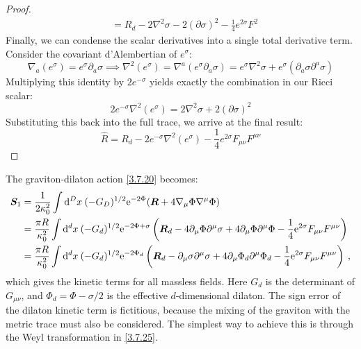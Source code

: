 \begin{tcolorbox}[breakable]
\begin{proof}
\begin{align}
				&= R_d - 2 \nabla^2 \sigma - 2 (\partial \sigma)^2 - \frac{1}{4} e^{2\sigma} F^2
			\end{align}
			Finally, we can condense the scalar derivatives into a single total derivative term. Consider the covariant d'Alembertian of $e^\sigma$:
			\begin{equation}
				\nabla_a (e^\sigma) = e^\sigma \partial_a \sigma \implies \nabla^2 (e^\sigma) = \nabla^a (e^\sigma \partial_a \sigma) = e^\sigma \nabla^2 \sigma + e^\sigma (\partial_a \sigma \partial^a \sigma)
			\end{equation}
			Multiplying this identity by $2e^{-\sigma}$ yields exactly the combination in our Ricci scalar:
			\begin{equation}
				2e^{-\sigma} \nabla^2 (e^\sigma) = 2 \nabla^2 \sigma + 2 (\partial \sigma)^2
			\end{equation}
			Substituting this back into the full trace, we arrive at the final result:
			\begin{equation}
				\boxed{ \hat{R} = R_d - 2 e^{-\sigma} \nabla^2 (e^\sigma) - \frac{1}{4} e^{2\sigma} F_{\mu\nu} F^{\mu\nu} }
			\end{equation}
	\end{proof}
\end{tcolorbox}
The graviton-dilaton action \eqref{3.7.20} becomes:
\begin{align}
	\bm{S}_{1} &= \frac{1}{2 \kappa_{0}^{2}} \int \mathrm{d}^{D} x \: (-G_{D})^{1/2} \mathrm{e}^{-2 \Phi}(\bm{R}
	+4 \nabla_{\mu} \Phi \nabla^{\mu} \Phi) \nonumber \\
	&= \frac{\pi R}{\kappa_{0}^{2}} \int \mathrm{d}^{d} x\: (-G_{d})^{1/2} \mathrm{e}^{-2 \Phi+\sigma}\left(\bm{R}_{d}-4 \partial_{\mu} \Phi \partial^{\mu} \sigma+
	4 \partial_{\mu} \Phi \partial^{\mu} \Phi-\frac{1}{4} \mathrm{e}^{2 \sigma} F_{\mu \nu} F^{\mu \nu}\right)\nonumber \\
	&= \frac{\pi R}{\kappa_{0}^{2}} \int  \mathrm{d}^{d} x \:(-G_{d})^{1 / 2} \mathrm{e}^{-2 \Phi_{d}} \left(\bm{R}_{d}-\partial_{\mu} \sigma \partial^{\mu} \sigma+4 \partial_{\mu} \Phi_{d} \partial^{\mu} \Phi_{d}-\frac{1}{4} \mathrm{e}^{2 \sigma} F_{\mu \nu} F^{\mu \nu}\right) \:, \label{8.1.9}
\end{align}
which gives the kinetic terms for all massless fields.
Here $G_{d}$ is the determinant of $G_{\mu \nu}$, and $\Phi_{d}=\Phi-\sigma / 2$ is the effective $d$-dimensional dilaton. The sign error of the dilaton kinetic term is fictitious, because the mixing of the graviton with the metric trace must also be considered. The simplest way to achieve this is through the Weyl transformation in \eqref{3.7.25}.

